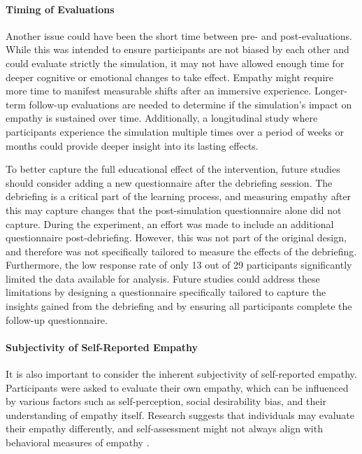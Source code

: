 \paragraph{Timing of Evaluations} Another issue could have been the short time between pre- and post-evaluations. While this was intended to ensure participants are not biased by each other and could evaluate strictly the simulation, it may not have allowed enough time for deeper cognitive or emotional changes to take effect. Empathy might require more time to manifest measurable shifts after an immersive experience. Longer-term follow-up evaluations are needed to determine if the simulation's impact on empathy is sustained over time. Additionally, a longitudinal study where participants experience the simulation multiple times over a period of weeks or months could provide deeper insight into its lasting effects. 

\vspace{1em}

To better capture the full educational effect of the intervention, future studies should consider adding a new questionnaire after the debriefing session. The debriefing is a critical part of the learning process, and measuring empathy after this may capture changes that the post-simulation questionnaire alone did not capture. During the experiment, an effort was made to include an additional questionnaire post-debriefing. However, this was not part of the original design, and therefore was not specifically tailored to measure the effects of the debriefing. Furthermore, the low response rate of only 13 out of 29 participants significantly limited the data available for analysis. Future studies could address these limitations by designing a questionnaire specifically tailored to capture the insights gained from the debriefing and by ensuring all participants complete the follow-up questionnaire.

\paragraph{Subjectivity of Self-Reported Empathy} It is also important to consider the inherent subjectivity of self-reported empathy. Participants were asked to evaluate their own empathy, which can be influenced by various factors such as self-perception, social desirability bias, and their understanding of empathy itself. Research suggests that individuals may evaluate their empathy differently, and self-assessment might not always align with behavioral measures of empathy \cite{Sunahara2022}.


